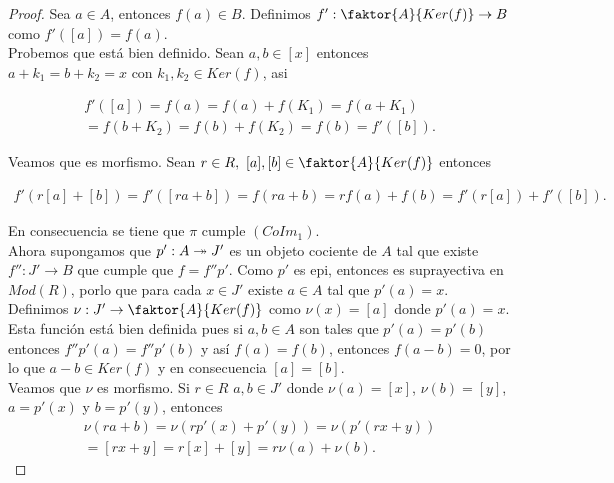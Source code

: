 \documentclass{article}
\begin{document}
\begin{enumerate}[label=\textbf{Ej \arabic*.}]
\begin{proof}
			Sea $a\in A$, entonces $f(a)\in B$. Definimos $f': \faktor{A}{Ker(f)}\to B$ como $f'([a])=f(a)$.\\
			
			Probemos que está bien definido. Sean $a,b\in [x]$ entonces \\$a+k_1=b+k_2=x$ con $k_1, k_2\in Ker(f)$, asi
			
			\begin{align*}
				f'([a])=f(a)=f(a)+f(K_1)=f(a+K_1)\\
				=f(b+K_2)=f(b)+f(K_2)=f(b)=f'([b]).
			\end{align*}
			
			Veamos que es morfismo. Sean $r\in R,\,\,[a],[b]\in  \faktor{A}{Ker(f)}$ entonces 
			
			\begin{align*}
				f'(r[a]+[b])=f'([ra+b])=f(ra+b)=rf(a)+f(b)=f'(r[a])+f'([b]).
			\end{align*}
			
			En consecuencia se tiene que $\pi$ cumple $(CoIm_1)$.\\
			
			Ahora supongamos que $p'\catarrow{}{A}{J'}{e}$ es un objeto cociente de $A$ tal que existe $f'':J'\to B$ que cumple que $f=f''p'$. Como $p'$ es
			epi, entonces es suprayectiva en $Mod(R)$, porlo que para cada $x\in J'$ existe $a\in A$ tal que $p'(a)=x$.\\
			
			Definimos $\nu:J'\to \faktor{A}{Ker(f)}$ como $\nu(x)=[a]$ donde $p'(a)=x$. Esta función está bien definida pues si $a,b\in A$ son tales que 
			$p'(a)=p'(b)$ entonces $f''p'(a)=f''p'(b)$ y así $f(a)=f(b)$, entonces $f(a-b)=0$, por lo que $a-b\in Ker(f)$ y en consecuencia $[a]=[b]$.\\
			
			Veamos que $\nu$ es morfismo. Si $r\in R\,\,a,b\in J'$ donde $\nu(a)=[x]$, $\nu(b)=[y]$, $a=p'(x)$ y $b=p'(y)$, entonces 
			\begin{gather*}
				\nu(ra+b)=\nu(rp'(x)+p'(y))=\nu(p'(rx+y))\\
				=[rx+y]=r[x]+[y]=r\nu(a)+\nu(b).
			\end{gather*}
			

\end{proof}
\end{enumerate}
\end{document}
